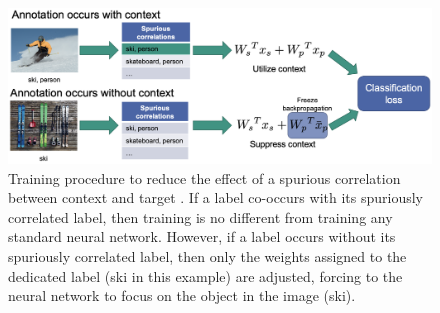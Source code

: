 \documentclass{article}
\begin{document}
\begin{figure}
    \centering
    \includegraphics[scale=0.44]{context_suppression.png}
    \caption{Training procedure to reduce the effect of a spurious correlation between context and target \cite{Singh_2020_CVPR}.
    If a label co-occurs with its spuriously correlated label, then training is
    no different from training any standard neural network. However, if a label occurs without its spuriously correlated
    label, then only the weights assigned to the dedicated label (ski in this example) are adjusted, forcing to the neural
    network to focus on the object in the image (ski).}
    \label{fig:contextSupprImg}
\end{figure}
\end{document}
